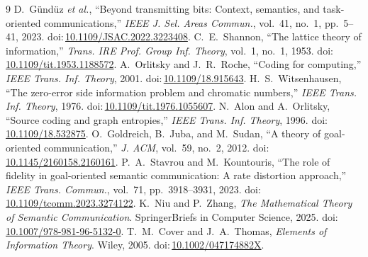 \documentclass[11pt]{article}
\newcommand{\doi}[1]{doi:\,\url{#1}}
\theoremstyle{definition}
\theoremstyle{remark}
\begin{document}
\begin{thebibliography}{9}
 D.~G\"und\"uz \emph{et al.}, ``Beyond transmitting bits: Context, semantics, and task-oriented communications,'' \emph{IEEE J. Sel. Areas Commun.}, vol.~41, no.~1, pp.~5--41, 2023. \doi{10.1109/JSAC.2022.3223408}.
 C.~E.~Shannon, ``The lattice theory of information,'' \emph{Trans. IRE Prof. Group Inf. Theory}, vol.~1, no.~1, 1953. \doi{10.1109/tit.1953.1188572}.
 A.~Orlitsky and J.~R.~Roche, ``Coding for computing,'' \emph{IEEE Trans. Inf. Theory}, 2001. \doi{10.1109/18.915643}.
 H.~S.~Witsenhausen, ``The zero-error side information problem and chromatic numbers,'' \emph{IEEE Trans. Inf. Theory}, 1976. \doi{10.1109/tit.1976.1055607}.
 N.~Alon and A.~Orlitsky, ``Source coding and graph entropies,'' \emph{IEEE Trans. Inf. Theory}, 1996. \doi{10.1109/18.532875}.
 O.~Goldreich, B.~Juba, and M.~Sudan, ``A theory of goal-oriented communication,'' \emph{J. ACM}, vol.~59, no.~2, 2012. \doi{10.1145/2160158.2160161}.
 P.~A.~Stavrou and M.~Kountouris, ``The role of fidelity in goal-oriented semantic communication: A rate distortion approach,'' \emph{IEEE Trans. Commun.}, vol.~71, pp.~3918--3931, 2023. \doi{10.1109/tcomm.2023.3274122}.
 K.~Niu and P.~Zhang, \emph{The Mathematical Theory of Semantic Communication}. SpringerBriefs in Computer Science, 2025. \doi{10.1007/978-981-96-5132-0}.
 T.~M.~Cover and J.~A.~Thomas, \emph{Elements of Information Theory}. Wiley, 2005. \doi{10.1002/047174882X}.
\end{thebibliography}
\end{document}
